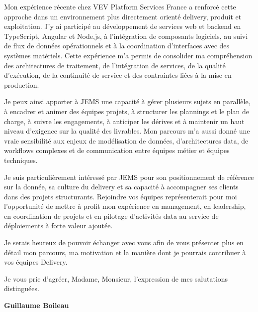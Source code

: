 \documentclass[11pt,a4paper]{../_shared/altacv}
\begin{document}
{Mon expérience récente chez VEV Platform Services France a renforcé cette approche dans un environnement plus directement orienté delivery, produit et exploitation. J'y ai participé au développement de services web et backend en TypeScript, Angular et Node.js, à l'intégration de composants logiciels, au suivi de flux de données opérationnels et à la coordination d'interfaces avec des systèmes matériels. Cette expérience m'a permis de consolider ma compréhension des architectures de traitement, de l'intégration de services, de la qualité d'exécution, de la continuité de service et des contraintes liées à la mise en production.

Je peux ainsi apporter à JEMS une capacité à gérer plusieurs sujets en parallèle, à encadrer et animer des équipes projets, à structurer les plannings et le plan de charge, à suivre les engagements, à anticiper les dérives et à maintenir un haut niveau d'exigence sur la qualité des livrables. Mon parcours m'a aussi donné une vraie sensibilité aux enjeux de modélisation de données, d'architectures data, de workflows complexes et de communication entre équipes métier et équipes techniques.

Je suis particulièrement intéressé par JEMS pour son positionnement de référence sur la donnée, sa culture du delivery et sa capacité à accompagner ses clients dans des projets structurants. Rejoindre vos équipes représenterait pour moi l'opportunité de mettre à profit mon expérience en management, en leadership, en coordination de projets et en pilotage d'activités data au service de déploiements à forte valeur ajoutée.

Je serais heureux de pouvoir échanger avec vous afin de vous présenter plus en détail mon parcours, ma motivation et la manière dont je pourrais contribuer à vos équipes Delivery.

Je vous prie d'agréer, Madame, Monsieur, l'expression de mes salutations distinguées.

\textbf{Guillaume Boileau}

}
\end{document}
